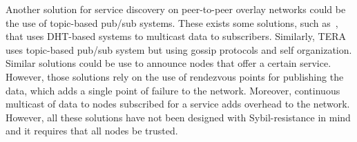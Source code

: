 Another solution for service discovery on peer-to-peer overlay networks could be the use of topic-based pub/sub systems. 
These exists some solutions,  such as~\cite{scribe,poldercast,banno2015}, that uses DHT-based systems to multicast data to subscribers.
Similarly, TERA~\cite{baldoni2007tera} uses topic-based pub/sub system
but using gossip protocols and self organization. 
Similar solutions could be use to announce nodes that offer a certain service.
However, those solutions rely on the use of rendezvous points for publishing the data,  which adds a single point of failure to the network.
Moreover, continuous multicast of data to nodes subscribed for a service adds overhead to the network.
However, all these solutions have not been designed with Sybil-resistance in mind and it requires that all nodes be trusted.


